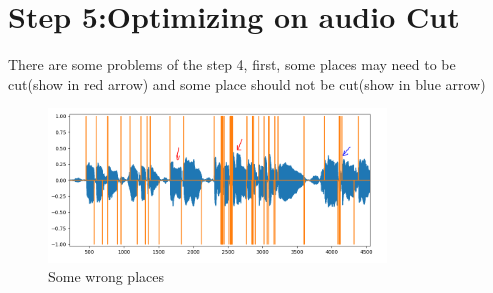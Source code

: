 \documentclass[twoside]{article}
\begin{document}
\section{Step 5:Optimizing on audio Cut}
There are some problems of the step 4, first, some places may need to be cut(show in red arrow) and some place should not be cut(show in blue arrow)\\
\begin{figure}[H]
   \centering
   \includegraphics[width = 0.8\textwidth]{first_cut_mark.PNG}  
   \caption{Some wrong places}
\end{figure}
\end{document}
